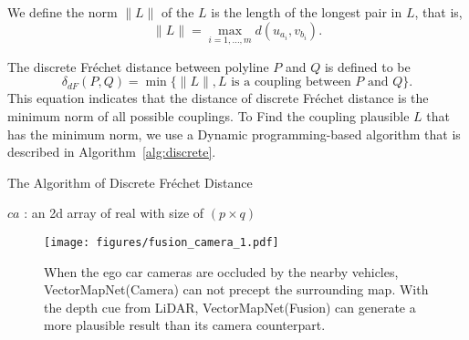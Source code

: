 \documentclass{article}
\theoremstyle{plain}
\theoremstyle{definition}
\theoremstyle{remark}
\begin{document}
We define the norm $\| L \|$ of the $L$ is the length of the longest pair in $L$, that is,
\begin{equation}
    \| L \| = \underset{i=1,\dots,m}{\max} d(u_{a_i}, v_{b_i}).
\end{equation}

The discrete Fr\'echet distance between polyline $P$ and $Q$ is defined to be
\begin{equation}
    \delta_{dF}(P, Q) = \min \{ \| L \|, \text{$L$ is a coupling between $P$ and $Q$} \}.
\end{equation}
This equation indicates that the distance of discrete Fr\'echet distance is the minimum norm of all possible couplings. To Find the coupling plausible $L$ that has the minimum norm, we use a Dynamic programming-based algorithm that is described in Algorithm~\ref{alg:discrete}.

\begin{algorithm}[H]
    \caption{The Algorithm of Discrete Fr\'echet Distance}
    \SetAlgoLined
    $ca$ : an 2d array of real with size of $(p \times q)$\;
    
    \label{alg:discrete}
\end{algorithm}



\begin{figure}[t]
  \centering
  \texttt{[image: figures/fusion\_camera\_1.pdf]}
  \caption{When the ego car cameras are occluded by the nearby vehicles, VectorMapNet(Camera) can not precept the surrounding map. With the depth cue from LiDAR, VectorMapNet(Fusion) can generate a more plausible result than its camera counterpart.}
  \label{fig:qualitative_Fusion1}
\end{figure}
\end{document}
